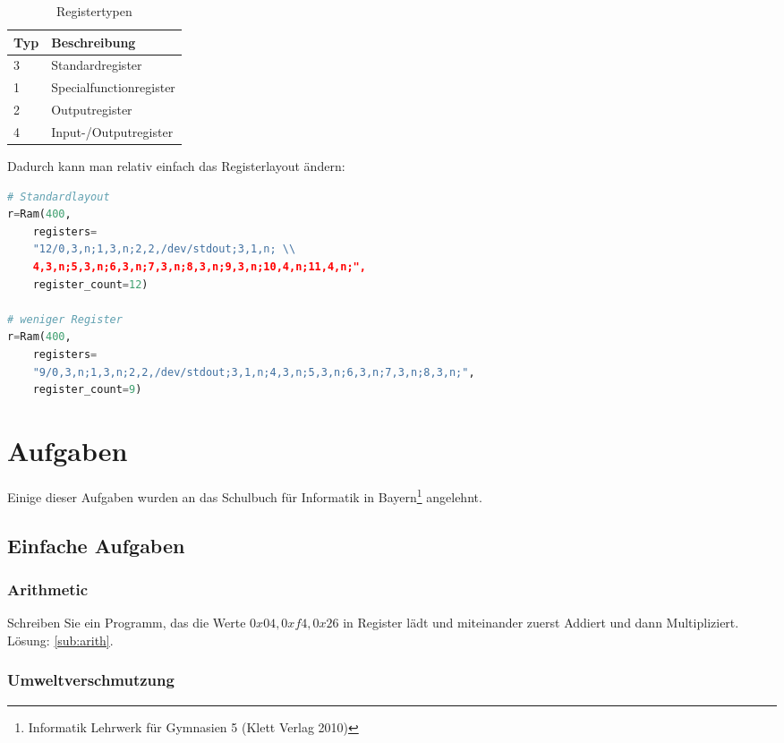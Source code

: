 \documentclass[a4paper,12pt,oneside]{scrreprt}
\begin{document}
\begin{table}[]
\centering
\caption{Registertypen}
\label{tab:regtypes}
\begin{tabular}{|l|l|}
\hline
 Typ & Beschreibung \\ \hline
 3 & Standardregister \\ \hline
 1 & Specialfunctionregister \\ \hline
 2 & Outputregister \\ \hline
 4 & Input-/Outputregister \\ \hline
\end{tabular}
\end{table}

Dadurch kann man relativ einfach das Registerlayout ändern:

\begin{lstlisting}[language=python]
# Standardlayout
r=Ram(400,
	registers=
	"12/0,3,n;1,3,n;2,2,/dev/stdout;3,1,n; \\
	4,3,n;5,3,n;6,3,n;7,3,n;8,3,n;9,3,n;10,4,n;11,4,n;",
	register_count=12)

# weniger Register
r=Ram(400,
	registers=
	"9/0,3,n;1,3,n;2,2,/dev/stdout;3,1,n;4,3,n;5,3,n;6,3,n;7,3,n;8,3,n;",
	register_count=9)

\end{lstlisting}

\chapter{Aufgaben}

Einige dieser Aufgaben wurden an das Schulbuch für Informatik in Bayern\footnote{ Informatik Lehrwerk für Gymnasien 5 (Klett Verlag 2010) } angelehnt.

\section{Einfache Aufgaben}

\subsection{Arithmetic}

Schreiben Sie ein Programm, das die Werte $ 0x04, 0xf4,  0x26 $ in Register lädt und miteinander zuerst Addiert und dann Multipliziert.
Lösung: \ref{sub:arith}.

\subsection{Umweltverschmutzung}
\end{document}

